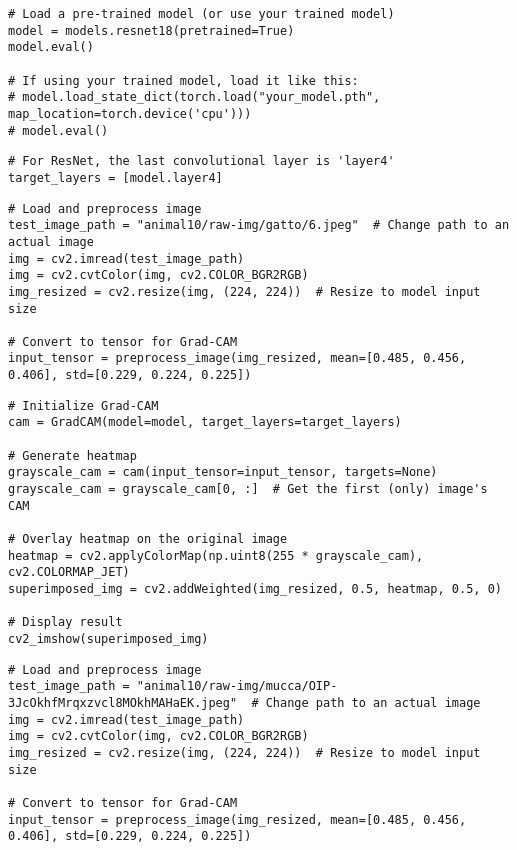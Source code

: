\begin{verbatim}
# Load a pre-trained model (or use your trained model)
model = models.resnet18(pretrained=True)
model.eval()

# If using your trained model, load it like this:
# model.load_state_dict(torch.load("your_model.pth", map_location=torch.device('cpu')))
# model.eval()

\end{verbatim}

\begin{verbatim}
# For ResNet, the last convolutional layer is 'layer4'
target_layers = [model.layer4]

\end{verbatim}

\begin{verbatim}
# Load and preprocess image
test_image_path = "animal10/raw-img/gatto/6.jpeg"  # Change path to an actual image
img = cv2.imread(test_image_path)
img = cv2.cvtColor(img, cv2.COLOR_BGR2RGB)
img_resized = cv2.resize(img, (224, 224))  # Resize to model input size

# Convert to tensor for Grad-CAM
input_tensor = preprocess_image(img_resized, mean=[0.485, 0.456, 0.406], std=[0.229, 0.224, 0.225])
\end{verbatim}

\begin{verbatim}
# Initialize Grad-CAM
cam = GradCAM(model=model, target_layers=target_layers)

# Generate heatmap
grayscale_cam = cam(input_tensor=input_tensor, targets=None)
grayscale_cam = grayscale_cam[0, :]  # Get the first (only) image's CAM

# Overlay heatmap on the original image
heatmap = cv2.applyColorMap(np.uint8(255 * grayscale_cam), cv2.COLORMAP_JET)
superimposed_img = cv2.addWeighted(img_resized, 0.5, heatmap, 0.5, 0)

# Display result
cv2_imshow(superimposed_img)

\end{verbatim}

\begin{verbatim}
# Load and preprocess image
test_image_path = "animal10/raw-img/mucca/OIP-3JcOkhfMrqxzvcl8MOkhMAHaEK.jpeg"  # Change path to an actual image
img = cv2.imread(test_image_path)
img = cv2.cvtColor(img, cv2.COLOR_BGR2RGB)
img_resized = cv2.resize(img, (224, 224))  # Resize to model input size

# Convert to tensor for Grad-CAM
input_tensor = preprocess_image(img_resized, mean=[0.485, 0.456, 0.406], std=[0.229, 0.224, 0.225])
\end{verbatim}

